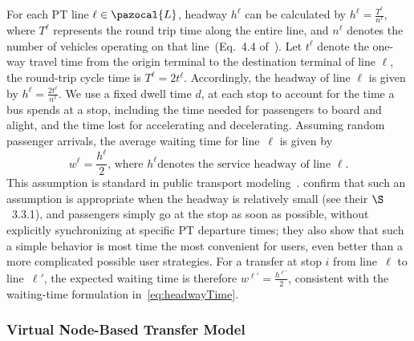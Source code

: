 \documentclass[a4paper,fleqn]{cas-sc}
\begin{document}
For each PT line $\ell \in \pazocal{L}$, headway $h^\ell$ can be calculated by $h^\ell = \frac{T^\ell}{n^\ell}$, where $T^\ell$ represents the round trip time along the entire line, and $n^\ell$ denotes the number of vehicles operating on that line~(Eq.~4.4 of~\citep{vuchic1981timed}).  
Let $t^\ell$ denote the one-way travel time from the origin terminal to the destination terminal of line $\ell$, the round-trip cycle time is $T^\ell = 2t^\ell$.
Accordingly, the headway of line $\ell$ is given by
$h^\ell = \frac{2t^\ell}{n^\ell}$.
%
We use a fixed dwell time $d$, at each stop to account for the time a bus spends at a stop, including the time needed for passengers to board and alight, and the time lost for accelerating and decelerating.
%
Assuming random passenger arrivals, the average waiting time for line~$\ell$ is given by
\begin{equation}
    w^\ell = \frac{h^\ell}{2}\text{, where }h^\ell \text{denotes the service headway of line~}\ell.
    \label{eq:headwayTime}
\end{equation}
This assumption is standard in public transport modeling~\citep{parbo2018reducing, zhang2018service}. 
\citet{liu2020does} confirm that such an assumption is appropriate when the headway is relatively small (see their $\S$~3.3.1), and passengers simply go at the stop as soon as possible, without explicitly synchronizing at specific PT departure times; they also show that such a simple behavior is most time the most convenient for users, even better than a more complicated possible user strategies.
%
For a transfer at stop $i$ from line~$\ell$ to line~$\ell'$, the expected waiting time is therefore
$w^{\ell'} = \frac{h^{\ell'}}{2}$, 
consistent with the waiting-time formulation in~\eqref{eq:headwayTime}.

\subsubsection{Virtual Node-Based Transfer Model}\label{sec:virtual_nodes}
\end{document}
